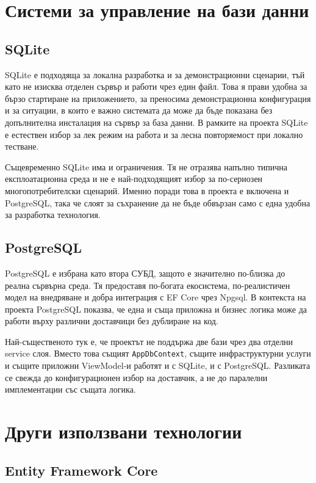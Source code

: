 \section{Системи за управление на бази данни}

\subsection{SQLite}

SQLite е подходяща за локална разработка и за демонстрационни сценарии, тъй като не изисква отделен сървър и работи чрез един файл. Това я прави удобна за бързо стартиране на приложението, за преносима демонстрационна конфигурация и за ситуации, в които е важно системата да може да бъде показана без допълнителна инсталация на сървър за база данни. В рамките на проекта SQLite е естествен избор за лек режим на работа и за лесна повторяемост при локално тестване.

Същевременно SQLite има и ограничения. Тя не отразява напълно типична експлоатационна среда и не е най-подходящият избор за по-сериозен многопотребителски сценарий. Именно поради това в проекта е включена и PostgreSQL, така че слоят за съхранение да не бъде обвързан само с една удобна за разработка технология.

\subsection{PostgreSQL}

PostgreSQL е избрана като втора СУБД, защото е значително по-близка до реална сървърна среда. Тя предоставя по-богата екосистема, по-реалистичен модел на внедряване и добра интеграция с EF Core чрез Npgsql. В контекста на проекта PostgreSQL показва, че една и съща приложна и бизнес логика може да работи върху различни доставчици без дублиране на код.

Най-същественото тук е, че проектът не поддържа две бази чрез два отделни service слоя. Вместо това същият \texttt{AppDbContext}, същите инфраструктурни услуги и същите приложни ViewModel-и работят и с SQLite, и с PostgreSQL. Разликата се свежда до конфигурационен избор на доставчик, а не до паралелни имплементации със същата логика.

\section{Други използвани технологии}

\subsection{Entity Framework Core}

